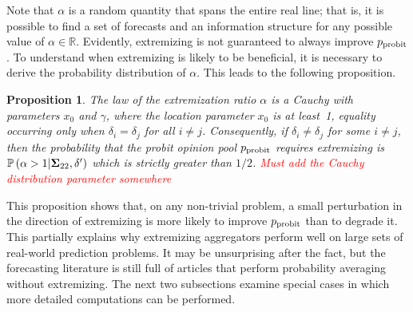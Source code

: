 \documentclass[12pt]{article}
\renewcommand{\P}{\mathbb{P}}
\newtheorem{proposition}[theorem]{Proposition}
\theoremstyle{definition}
\theoremstyle{definition}
\def\P{{\mathbb P}}
\def\probit{p_{\rm probit}}
\begin{document}
Note that $\alpha$ is a random quantity that spans the entire real line;
that is, it is possible to find a set of forecasts and an information structure for any possible value of $\alpha \in
\mathbb{R}$.  Evidently, extremizing is not guaranteed to always
improve $\probit$.  To understand when extremizing is
likely to be beneficial, it is necessary to derive the probability
distribution of $\alpha$. This leads to the following proposition.  

\begin{proposition}
\label{positiveProbThm}
The law of the extremization ratio $\alpha$ is a Cauchy with
parameters $x_0$ and $\gamma$, where the location parameter $x_0$ is
at least~1, equality occurring only when $\delta_i = \delta_j$ for all
$i \neq j$. Consequently, if $\delta_i \neq \delta_j$ for some
$i \neq j$, then the probability that the probit opinion pool $\probit$
requires extremizing is $\P\left(\alpha > 1 | {\bf\Sigma}_{22}, \delta'\right)$ which
is strictly greater than $1/2$.
\textcolor{red}{Must add the Cauchy distribution parameter somewhere}
\end{proposition}
\noindent
This proposition shows that, on any non-trivial problem, a small
perturbation in the direction of extremizing is more likely to improve
$\probit$ than to degrade it.  This partially explains
why extremizing aggregators perform well on large sets of real-world
prediction problems.  It may be unsurprising after the fact, but the
forecasting literature is still full of articles that perform
probability averaging without extremizing. The next two subsections examine special cases in which more detailed computations can be performed.

\end{document}
